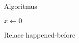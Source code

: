 \documentclass[11pt]{beamer}
\begin{document}
%
\begin{frame}[fragile]{Algoritmus}

\begin{algorithmic}
\State $x \gets 0$
\end{algorithmic}


%  
%  
%  


\end{frame}


\begin{frame}{Relace happened-before}

\end{frame}
\end{document}
